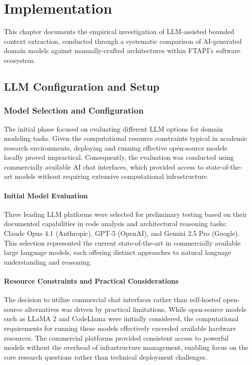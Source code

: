 \chapter{Implementation}
This chapter documents the empirical investigation of LLM-assisted bounded context extraction, conducted through a systematic comparison of AI-generated domain models against manually-crafted architectures within FTAPI's software ecosystem.

\section{LLM Configuration and Setup}

\subsection{Model Selection and Configuration}
The initial phase focused on evaluating different LLM options for domain modeling tasks. Given the computational resource constraints typical in academic research environments, deploying and running effective open-source models locally proved impractical. Consequently, the evaluation was conducted using commercially available AI chat interfaces, which provided access to state-of-the-art models without requiring extensive computational infrastructure.

\subsubsection{Initial Model Evaluation}
Three leading LLM platforms were selected for preliminary testing based on their documented capabilities in code analysis and architectural reasoning tasks: Claude Opus 4.1 (Anthropic), GPT-5 (OpenAI), and Gemini 2.5 Pro (Google). This selection represented the current state-of-the-art in commercially available large language models, each offering distinct approaches to natural language understanding and reasoning.

\subsubsection{Resource Constraints and Practical Considerations}
The decision to utilize commercial chat interfaces rather than self-hosted open-source alternatives was driven by practical limitations. While open-source models such as LLaMA 2 and CodeLlama were initially considered, the computational requirements for running these models effectively exceeded available hardware resources. The commercial platforms provided consistent access to powerful models without the overhead of infrastructure management, enabling focus on the core research questions rather than technical deployment challenges.

